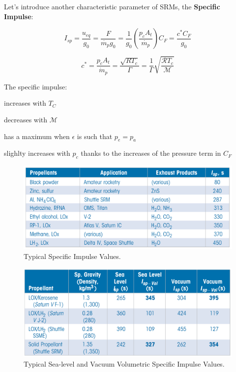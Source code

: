 \documentclass[
  ignorenonframetext,
]{beamer}
\begin{document}
\begin{frame}
Let's introduce another characteristic parameter of SRMs, the
\textbf{Specific Impulse}:

\[I_{sp} = \frac{u_{eq}}{g_0} = \frac{F}{\dot{m_p}g_0} = \frac{1}{g_0} \left(\frac{p_c A_t}{\dot{m_p}} \right) C_F = \frac{c^* C_F}{g_0}\]

\[c^* = \frac{p_c A_t}{\dot{m}_p} = \frac{\sqrt{R T_c}}{\Gamma} = \frac{1}{\Gamma} \sqrt{\frac{\mathcal{R} T_c}{\mathcal{M}}}\]

The specific impulse:

increases with \(T_C\)

decreases with \(\mathcal{M}\)

has a maximum when \(\epsilon\) is such that \(p_e = p_a\)

slighlty increases with \(p_c\) thanks to the increases of the pressure
term in \(C_F\)
\end{frame}

\begin{frame}
\begin{figure}

{\centering \includegraphics{tabs/tab4.1.png}

}

\caption{Typical Specific Impulse Values.}

\end{figure}
\end{frame}

\begin{frame}
\begin{figure}

{\centering \includegraphics{tabs/tab4.2.png}

}

\caption{Typical Sea-level and Vacuum Volumetric Specific Impulse
Values.}

\end{figure}
\end{frame}
\end{document}
